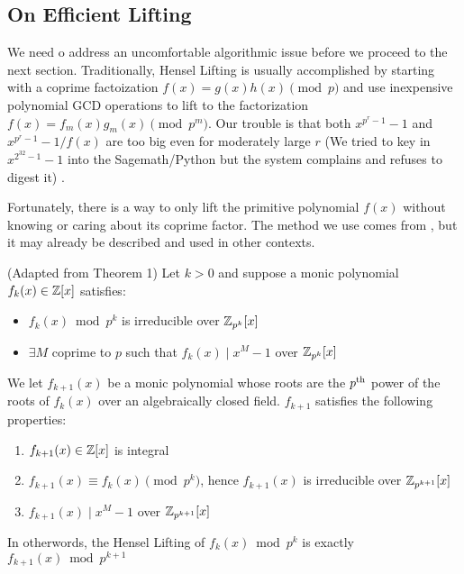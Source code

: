 \subsection{On Efficient Lifting}
We need o address an uncomfortable algorithmic issue before we proceed to the next section. Traditionally, Hensel Lifting is usually accomplished by starting with a coprime factoization \(f(x) = g(x)h(x) \pmod{p}\) and use inexpensive polynomial GCD operations to lift to the factorization \(f(x) = f_m(x) g_m(x) \pmod{p^m}\). Our trouble is that both \(x^{p^r - 1} - 1\) and \(x^{p^r - 1} - 1 / f(x)\) are too big even for moderately large \(r\) \ifFullVersion(We tried to key in \(x^{2^{32} - 1} - 1\) into the Sagemath/Python but the system complains and refuses to digest it) \fi.

Fortunately, there is a way to only lift the primitive polynomial \(f(x)\) without knowing or caring about its coprime factor. The method we use comes from \cite{IRISHMATH:Gary01}, but it may already be described and used in other contexts.

\begin{proposition}{(Adapted from \cite{IRISHMATH:Gary01} Theorem 1)} \label{prop:LiftPrimOnly}
    Let \(k > 0\) and suppose a monic polynomial \(f_k(x) \in \mathbb{Z}[x]\) satisfies:
    \begin{itemize}
        \item \(f_k(x) \bmod p^k\) is irreducible over \(\mathbb{Z}_{p^k}[x]\)
        \item \(\exists M\) coprime to \(p\) such that \(f_k(x) \mid x^M - 1\) over \(\mathbb{Z}_{p^k}[x]\)
    \end{itemize}
    We let \(f_{k+1}(x)\) be a monic polynomial whose roots are the \(p\textsuperscript{th}\) power of the roots of \(f_k(x)\) over an algebraically closed field. \(f_{k+1}\) satisfies the following properties:
    \begin{enumerate}
        \item \(f_{k+1}(x) \in \mathbb{Z}[x]\) is integral
        \item \(f_{k+1}(x) \equiv f_k(x) \pmod{p^k}\), hence \(f_{k+1}(x)\) is irreducible over \(\mathbb{Z}_{p^{k+1}}[x]\)
        \item \(f_{k+1}(x) \mid x^M - 1\) over \(\mathbb{Z}_{p^{k+1}}[x]\)
    \end{enumerate}
    In otherwords, the Hensel Lifting of \(f_k(x) \bmod p^k\) is exactly \(f_{k+1}(x) \bmod p^{k+1}\)
\end{proposition}

